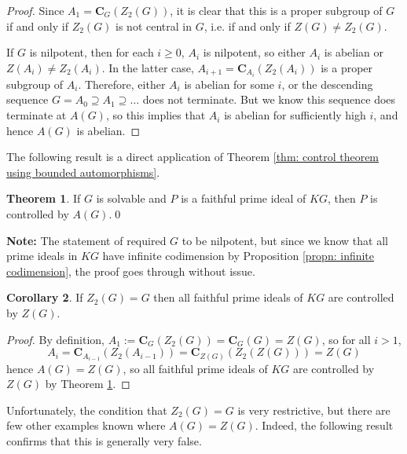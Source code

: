 \documentclass[12pt,a4paper]{article}
\theoremstyle{definition}
\newtheorem{thm}{Theorem}[section]
\newtheorem{cor}[thm]{Corollary}
\theoremstyle{remark}
\theoremstyle{custthm}
\begin{document}
\begin{proof}

Since $A_1=\mathbf{C}_{G}(Z_2(G))$, it is clear that this is a proper subgroup of $G$ if and only if $Z_2(G)$ is not central in $G$, i.e. if and only if $Z(G)\neq Z_2(G)$.

If $G$ is nilpotent, then for each $i\geq 0$, $A_i$ is nilpotent, so either $A_i$ is abelian or $Z(A_i)\neq Z_2(A_i)$. In the latter case, $A_{i+1}=\mathbf{C}_{A_i}(Z_2(A_i))$ is a proper subgroup of $A_i$. Therefore, either $A_i$ is abelian for some $i$, or the descending sequence $G=A_0\supseteq A_1\supseteq\dots$ does not terminate. But we know this sequence does terminate at $A(G)$, so this implies that $A_i$ is abelian for sufficiently high $i$, and hence $A(G)$ is abelian.\end{proof}

The following result is a direct application of Theorem \ref{thm: control theorem using bounded automorphisms}.

\begin{thm}\cite[Theorem B and proof in \S 3.5]{jones-primitive-ideals}\label{thm: faithful primes controlled by A(G)}
If $G$ is solvable and $P$ is a faithful prime ideal of $KG$, then $P$ is controlled by $A(G)$.\qed
\end{thm}

\textbf{Note:} The statement of \cite[Theorem B]{jones-primitive-ideals} required $G$ to be nilpotent, but since we know that all prime ideals in $KG$ have infinite codimension by Proposition \ref{propn: infinite codimension}, the proof goes through without issue.

\begin{cor}\label{cor: class 2}
If $Z_2(G)=G$ then all faithful prime ideals of $KG$ are controlled by $Z(G)$.
\end{cor}

\begin{proof}
By definition, $A_1:=\mathbf{C}_G(Z_2(G))=\mathbf{C}_G(G)=Z(G)$, so for all $i>1$, $$A_i=\mathbf{C}_{A_{i-1}}(Z_2(A_{i-1}))=\mathbf{C}_{Z(G)}(Z_2(Z(G)))=Z(G)$$ hence $A(G)=Z(G)$, so all faithful prime ideals of $KG$ are controlled by $Z(G)$ by Theorem \ref{thm: faithful primes controlled by A(G)}.\end{proof}

Unfortunately, the condition that $Z_2(G)=G$ is very restrictive, but there are few other examples known where $A(G)=Z(G)$. Indeed, the following result confirms that this is generally very false. 
\end{document}
